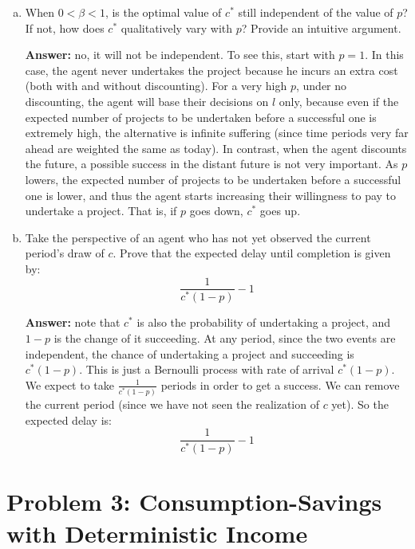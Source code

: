 \documentclass[11pt]{extarticle}
\theoremstyle{plain}
\theoremstyle{definition}
\begin{document}
\begin{enumerate}[(a)]
\item When $0 < \beta < 1$, is the optimal value of $c^*$ still independent of the value of $p$? If not, how does $c^*$ qualitatively vary with $p$? Provide an intuitive argument.

\textbf{Answer:} no, it will not be independent. To see this, start with $p=1$. In this case, the agent never undertakes the project because he incurs an extra cost (both with and without discounting). For a very high $p$, under no discounting, the agent will base their decisions on $l$ only, because even if the expected number of projects to be undertaken before a successful one is extremely high, the alternative is infinite suffering (since time periods very far ahead are weighted the same as today). In contrast, when the agent discounts the future, a possible success in the distant future is not very important. As $p$ lowers, the expected number of projects to be undertaken before a successful one is lower, and thus the agent starts increasing their willingness to pay to undertake a project. That is, if $p$ goes down, $c^*$ goes up.

\item Take the perspective of an agent who has not yet observed the current period's draw of $c$. Prove that the expected delay until completion is given by:
\begin{equation*}
	\frac{1}{c^*(1-p)} - 1
\end{equation*}

\textbf{Answer:} note that $c^*$ is also the probability of undertaking a project, and $1-p$ is the change of it succeeding. At any period, since the two events are independent, the chance of undertaking a project and succeeding is $c^*(1-p)$. This is just a Bernoulli process with rate of arrival $c^*(1-p)$. We expect to take $\frac{1}{c^*(1-p)}$ periods in order to get a success. We can remove the current period (since we have not seen the realization of $c$ yet). So the expected delay is:
$$\frac{1}{c^*(1-p)} - 1$$

\end{enumerate}


\newpage
\section*{Problem 3: Consumption-Savings with Deterministic Income}
\end{document}

